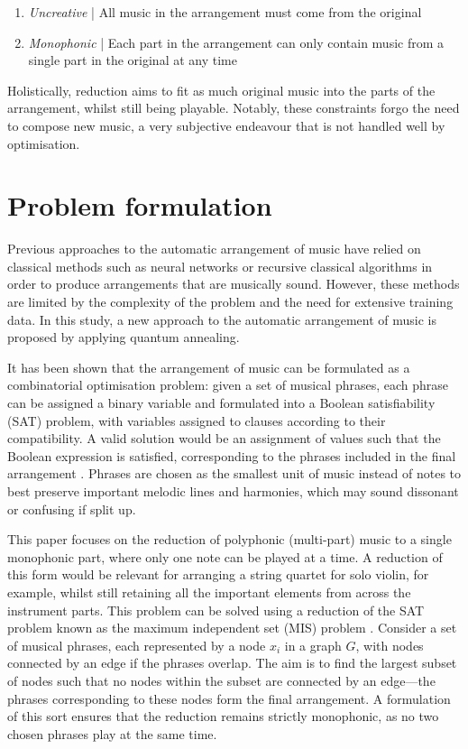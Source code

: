 \documentclass[12pt]{article}
\begin{document}
\begin{enumerate}
    \item \emph{Uncreative} | All music in the arrangement must come from the original
    \item \emph{Monophonic} | Each part in the arrangement can only contain music from a single part in the original at any time
\end{enumerate}

Holistically, reduction aims to fit as much original music into the parts of the arrangement, whilst still being playable. Notably, these constraints forgo the need to compose new music, a very subjective endeavour that is not handled well by optimisation.

\section{Problem formulation}

Previous approaches to the automatic arrangement of music have relied on classical methods such as neural networks  or recursive classical algorithms  in order to produce arrangements that are musically sound. However, these methods are limited by the complexity of the problem and the need for extensive training data. In this study, a new approach to the automatic arrangement of music is proposed by applying quantum annealing.

It has been shown that the arrangement of music can be formulated as a combinatorial optimisation problem: given a set of musical phrases, each phrase can be assigned a binary variable and formulated into a Boolean satisfiability (SAT) problem, with variables assigned to clauses according to their compatibility. A valid solution would be an assignment of values such that the Boolean expression is satisfied, corresponding to the phrases included in the final arrangement . Phrases are chosen as the smallest unit of music instead of notes to best preserve important melodic lines and harmonies, which may sound dissonant or confusing if split up.

This paper focuses on the reduction of polyphonic (multi-part) music to a single monophonic part, where only one note can be played at a time. A reduction of this form would be relevant for arranging a string quartet for solo violin, for example, whilst still retaining all the important elements from across the instrument parts. This problem can be solved using a reduction of the SAT problem known as the maximum independent set (MIS) problem . Consider a set of musical phrases, each represented by a node $x_i$ in a graph $G$, with nodes connected by an edge if the phrases overlap. The aim is to find the largest subset of nodes such that no nodes within the subset are connected by an edge—the phrases corresponding to these nodes form the final arrangement. A formulation of this sort ensures that the reduction remains strictly monophonic, as no two chosen phrases play at the same time.
\end{document}
